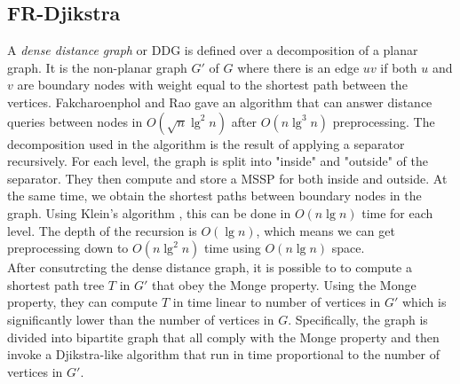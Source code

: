 \subsection{FR-Djikstra}
A \textit{dense distance graph} or DDG is defined over a decomposition of a planar
graph. It is the non-planar graph $G'$ of $G$ where there is an edge $uv$ if both $u$ and
$v$ are boundary nodes with weight equal to the shortest path between the vertices.
Fakcharoenphol and Rao \cite{fakcharoenphol2006planar} gave an algorithm that can answer
distance queries between nodes in $O(\sqrt{n}\lg^2 n)$ after $O(n\lg^3 n)$ preprocessing.
The decomposition used in the algorithm is the result of applying a separator
recursively. For each level, the graph is split into "inside" and "outside" of the
separator. They then compute and store a MSSP for both inside and outside. At the same
time, we obtain the shortest paths between boundary nodes in the graph. Using Klein's
algorithm \cite{klein2005multiple}, this can be done in $O(n\lg n)$ time for each level.
The depth of the recursion is $O(\lg n)$, which means we can get preprocessing down to
$O(n\lg^2 n)$ time using $O(n\lg n)$ space. \\
After consutrcting the dense distance graph, it is possible to to compute a shortest path
tree $T$ in $G'$ that obey the Monge property. Using the Monge property, they can compute
$T$ in time linear to number of vertices in $G'$ which is significantly lower than the
number of vertices in $G$. Specifically, the graph is divided into bipartite graph that
all comply with the Monge property and then invoke a Djikstra-like algorithm that run in
time proportional to the number of vertices in $G'$.
